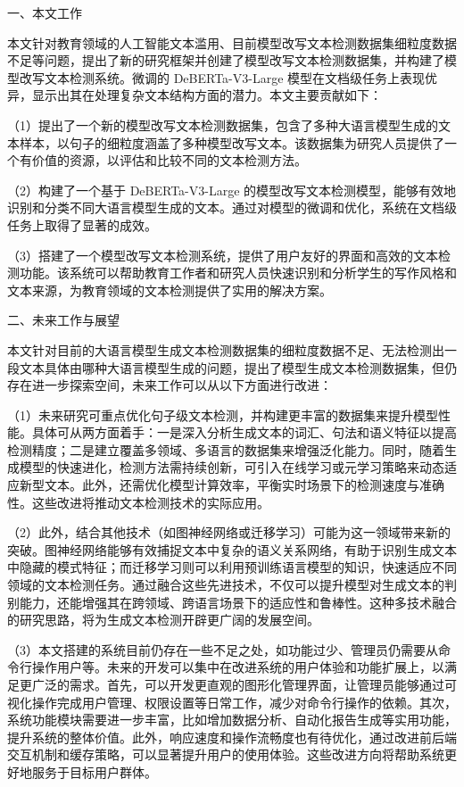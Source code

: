 %
%
%
%

\begin{conclusion}

一、本文工作

本文针对教育领域的人工智能文本滥用、目前模型改写文本检测数据集细粒度数据不足等问题，提出了新的研究框架并创建了模型改写文本检测数据集，并构建了模型改写文本检测系统。微调的 DeBERTa-V3-Large 模型在文档级任务上表现优异，显示出其在处理复杂文本结构方面的潜力。本文主要贡献如下：

（1）提出了一个新的模型改写文本检测数据集，包含了多种大语言模型生成的文本样本，以句子的细粒度涵盖了多种模型改写文本。该数据集为研究人员提供了一个有价值的资源，以评估和比较不同的文本检测方法。

（2）构建了一个基于 DeBERTa-V3-Large 的模型改写文本检测模型，能够有效地识别和分类不同大语言模型生成的文本。通过对模型的微调和优化，系统在文档级任务上取得了显著的成效。

（3）搭建了一个模型改写文本检测系统，提供了用户友好的界面和高效的文本检测功能。该系统可以帮助教育工作者和研究人员快速识别和分析学生的写作风格和文本来源，为教育领域的文本检测提供了实用的解决方案。

二、未来工作与展望

本文针对目前的大语言模型生成文本检测数据集的细粒度数据不足、无法检测出一段文本具体由哪种大语言模型生成的问题，提出了模型生成文本检测数据集，但仍存在进一步探索空间，未来工作可以从以下方面进行改进：

（1）未来研究可重点优化句子级文本检测，并构建更丰富的数据集来提升模型性能。具体可从两方面着手：一是深入分析生成文本的词汇、句法和语义特征以提高检测精度；二是建立覆盖多领域、多语言的数据集来增强泛化能力。同时，随着生成模型的快速进化，检测方法需持续创新，可引入在线学习或元学习策略来动态适应新型文本。此外，还需优化模型计算效率，平衡实时场景下的检测速度与准确性。这些改进将推动文本检测技术的实际应用。

（2）此外，结合其他技术（如图神经网络或迁移学习）可能为这一领域带来新的突破。图神经网络能够有效捕捉文本中复杂的语义关系网络，有助于识别生成文本中隐藏的模式特征；而迁移学习则可以利用预训练语言模型的知识，快速适应不同领域的文本检测任务。通过融合这些先进技术，不仅可以提升模型对生成文本的判别能力，还能增强其在跨领域、跨语言场景下的适应性和鲁棒性。这种多技术融合的研究思路，将为生成文本检测开辟更广阔的发展空间。

（3）本文搭建的系统目前仍存在一些不足之处，如功能过少、管理员仍需要从命令行操作用户等。未来的开发可以集中在改进系统的用户体验和功能扩展上，以满足更广泛的需求。首先，可以开发更直观的图形化管理界面，让管理员能够通过可视化操作完成用户管理、权限设置等日常工作，减少对命令行操作的依赖。其次，系统功能模块需要进一步丰富，比如增加数据分析、自动化报告生成等实用功能，提升系统的整体价值。此外，响应速度和操作流畅度也有待优化，通过改进前后端交互机制和缓存策略，可以显著提升用户的使用体验。这些改进方向将帮助系统更好地服务于目标用户群体。

\end{conclusion}
